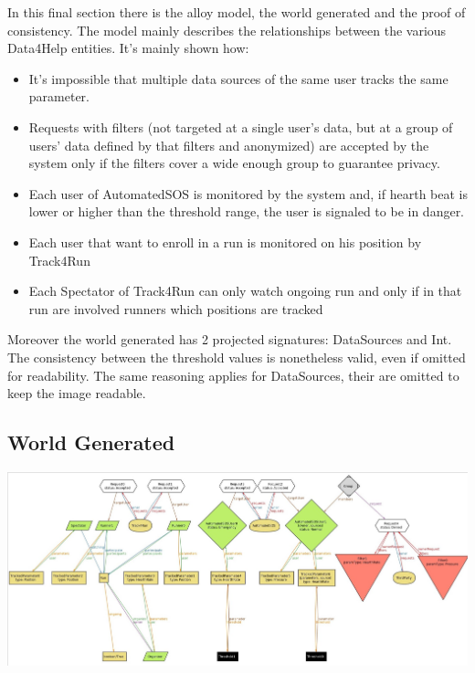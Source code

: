In this final section there is the alloy model, the world generated and the proof of consistency.
The model mainly describes the relationships between the various Data4Help entities. It's mainly shown how:
\begin{itemize}
\item It's impossible that multiple data sources of the same user tracks the same parameter.
\item Requests with filters (not targeted at a single user's data, but at a group of users' data defined by that filters and anonymized) are accepted by the system only if the filters cover a wide enough group to guarantee privacy.
\item Each user of AutomatedSOS is monitored by the system and, if hearth beat is lower or higher than the threshold range, the user is signaled to be in danger.
\item Each user that want to enroll in a run is monitored on his position by Track4Run
\item Each Spectator of Track4Run can only watch ongoing run and only if in that run are involved runners which positions are tracked
\end{itemize}
Moreover the world generated has 2 projected signatures: DataSources and Int. The consistency between the threshold values is nonetheless valid, even if omitted for readability. The same reasoning applies for DataSources, their are omitted to keep the image readable.\\


\subsection{World Generated}
\centering
\includegraphics[angle=90, width =\textwidth, height=\textheight, keepaspectratio]{../Alloy/worldGenerated.jpg}\\
